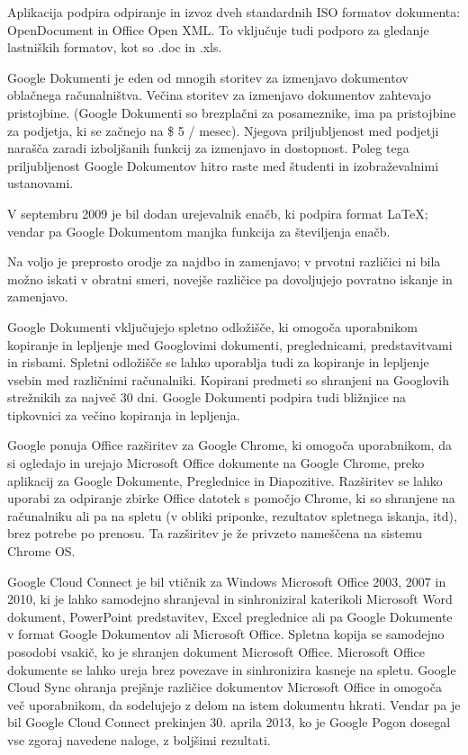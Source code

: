\documentclass[a4paper, 12pt]{book}
\begin{document}
Aplikacija podpira odpiranje in izvoz dveh standardnih ISO formatov dokumenta: OpenDocument in Office Open XML. To vključuje tudi podporo za gledanje lastniških formatov, kot so .doc in .xls. \cite{57} 

Google Dokumenti je eden od mnogih storitev za izmenjavo dokumentov oblačnega računalništva. \cite{58} Večina storitev za izmenjavo dokumentov zahtevajo pristojbine. (Google Dokumenti so brezplačni za posameznike, ima pa pristojbine za podjetja, ki se začnejo na \$ 5 / mesec). \cite{59} Njegova priljubljenost med podjetji narašča zaradi izboljšanih funkcij za izmenjavo in dostopnost. Poleg tega priljubljenost Google Dokumentov  hitro raste  med študenti in izobraževalnimi ustanovami. \cite{60}

V septembru 2009 je bil dodan urejevalnik enačb, ki podpira format LaTeX; vendar pa Google Dokumentom manjka funkcija za številjenja enačb. \cite{61} \cite{62}

Na voljo je preprosto orodje za najdbo in zamenjavo; v prvotni različici ni bila možno iskati v obratni smeri, novejše različice pa dovoljujejo povratno iskanje in zamenjavo.

Google Dokumenti vključujejo spletno odložišče, ki omogoča uporabnikom kopiranje in lepljenje  med Googlovimi dokumenti, preglednicami, predstavitvami in risbami. Spletni odložišče se lahko uporablja tudi za kopiranje in lepljenje vsebin med različnimi računalniki. Kopirani predmeti so shranjeni na Googlovih strežnikih za največ 30 dni. Google Dokumenti podpira tudi bližnjice na tipkovnici za večino kopiranja in lepljenja. \cite{63}

Google ponuja Office razširitev za Google Chrome, ki omogoča uporabnikom, da si ogledajo in urejajo Microsoft Office dokumente na Google Chrome, preko aplikacij za Google Dokumente, Preglednice in Diapozitive. Razširitev se lahko uporabi za odpiranje zbirke Office datotek s pomočjo Chrome, ki so shranjene na računalniku  ali pa na spletu (v obliki priponke, rezultatov spletnega iskanja, itd), brez potrebe po prenosu. Ta razširitev je že privzeto nameščena na sistemu Chrome OS. \cite{64}

Google Cloud Connect je bil vtičnik za Windows Microsoft Office 2003, 2007 in 2010, ki je lahko samodejno shranjeval in sinhroniziral katerikoli Microsoft Word dokument, PowerPoint predstavitev, Excel preglednice ali pa Google Dokumente v format Google Dokumentov ali Microsoft Office. Spletna kopija se samodejno posodobi vsakič, ko je shranjen dokument Microsoft Office. Microsoft Office dokumente se lahko ureja brez povezave  in sinhronizira kasneje na spletu. Google Cloud Sync ohranja prejšnje različice dokumentov Microsoft Office in omogoča več uporabnikom, da sodelujejo z delom na istem dokumentu hkrati. \cite{65} \cite{66} Vendar pa je bil Google Cloud Connect prekinjen 30. aprila 2013, ko je Google Pogon dosegal vse zgoraj navedene naloge, z boljšimi rezultati. \cite{67}
\end{document}
